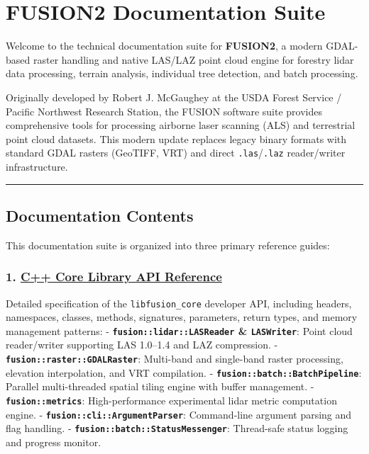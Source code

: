 \documentclass[
]{article}
\author{}
\date{}
\renewcommand*\contentsname{Table of contents}
\newcommand\contentsname{Table of contents}
\begin{document}
\renewcommand*\contentsname{Table of contents}
{
\setcounter{tocdepth}{3}
\tableofcontents
}

\section{FUSION2 Documentation
Suite}\label{fusion2-documentation-suite}

Welcome to the technical documentation suite for \textbf{FUSION2},
a modern GDAL-based raster handling and native LAS/LAZ point cloud
engine for forestry lidar data processing, terrain analysis, individual
tree detection, and batch processing.

Originally developed by Robert J. McGaughey at the USDA Forest Service /
Pacific Northwest Research Station, the FUSION software suite provides
comprehensive tools for processing airborne laser scanning (ALS) and
terrestrial point cloud datasets. This modern update replaces legacy
binary formats with standard GDAL rasters (GeoTIFF, VRT) and direct
\texttt{.las}/\texttt{.laz} reader/writer infrastructure.

\begin{center}\rule{0.5\linewidth}{0.5pt}\end{center}

\subsection{Documentation Contents}\label{documentation-contents}

This documentation suite is organized into three primary reference
guides:

\subsubsection{\texorpdfstring{1. \href{API_REFERENCE.md}{C++ Core
Library API
Reference}}{1. C++ Core Library API Reference}}\label{c-core-library-api-reference}

Detailed specification of the \texttt{libfusion\_core} developer API,
including headers, namespaces, classes, methods, signatures, parameters,
return types, and memory management patterns: -
\textbf{\texttt{fusion::lidar::LASReader} \& \texttt{LASWriter}}: Point
cloud reader/writer supporting LAS 1.0--1.4 and LAZ compression. -
\textbf{\texttt{fusion::raster::GDALRaster}}: Multi-band and single-band
raster processing, elevation interpolation, and VRT compilation. -
\textbf{\texttt{fusion::batch::BatchPipeline}}: Parallel multi-threaded
spatial tiling engine with buffer management. -
\textbf{\texttt{fusion::metrics}}: High-performance experimental lidar
metric computation engine. -
\textbf{\texttt{fusion::cli::ArgumentParser}}: Command-line argument
parsing and flag handling. -
\textbf{\texttt{fusion::batch::StatusMessenger}}: Thread-safe status
logging and progress monitor.
\end{document}
